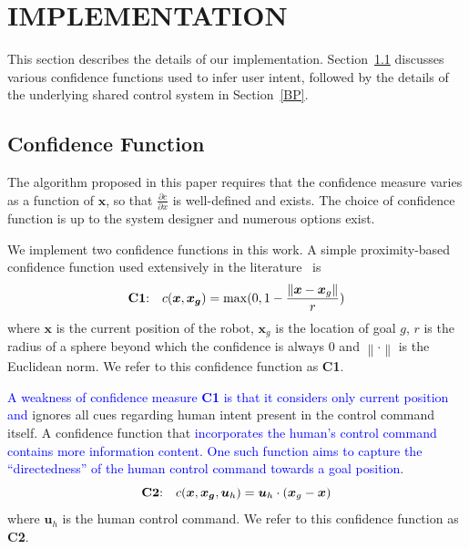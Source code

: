 \documentclass[conference]{IEEEtran}
\newcommand{\norm}[1]{\left\lVert#1\right\rVert}
\begin{document}
\section{IMPLEMENTATION}\label{IMPL}
This section describes the details of our implementation. Section~\ref{CF} discusses various confidence functions used to infer user intent, followed by the details of the underlying shared control system in Section~\ref{BP}.
\subsection{Confidence Function}\label{CF}
The algorithm proposed in this paper requires that the confidence measure varies as a function of $\boldsymbol{x}$, so that $\frac{\partial c}{\partial x}$ is well-defined and exists. The choice of confidence function is up to the system designer and numerous options exist.
 
We implement two confidence functions in this work. A simple proximity-based confidence function used extensively in the literature~\cite{dragan2012assistive,dragan2012formalizing,dragan2013policy} is
\begin{equation*}\label{C1}
\textrm{\textbf{C1}:}~~~c(\boldsymbol{x}, \boldsymbol{x_g}) = \max(0, 1 - \frac{\norm{\boldsymbol{x} - \boldsymbol{x}_{g}}}{r})
\end{equation*}
where $\boldsymbol{x}$ is the current position of the robot, $\boldsymbol{x}_{g}$ is the location of goal $g$, $r$ is the radius of a sphere beyond which the confidence is always $0$ and $\norm{\cdot}$ is the Euclidean norm. We refer to this confidence function as \textbf{C1}. 

\textcolor{blue}{A weakness of confidence measure \textbf{C1} is that it considers only current position and} ignores all cues regarding human intent present in the control command itself. A confidence function that \textcolor{blue}{incorporates the human's control command contains more information content. One such function aims to capture the ``directedness'' of the human control command towards a goal position}.
\begin{equation*}\label{C2}
\textrm{\textbf{C2}:}~~~c({\boldsymbol{x},\boldsymbol{x_g}, \boldsymbol{u}_{h}}) = \boldsymbol{u}_h\cdot(\boldsymbol{x}_{g} - \boldsymbol{x})
\end{equation*}
where $\boldsymbol{u}_h$ is the human control command. We refer to this confidence function as \textbf{C2}. 
\end{document}
